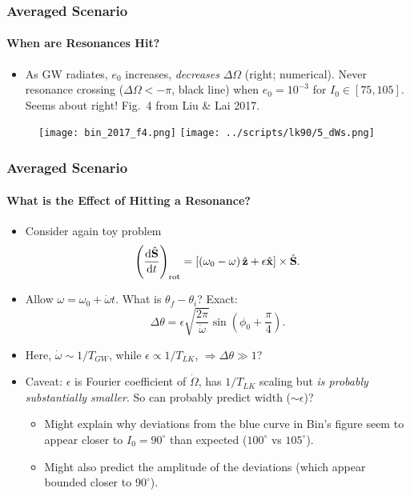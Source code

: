 \documentclass[dvipsnames, 8pt]{beamer}
\newcommand*{\rd}[2]{\frac{\mathrm{d}#1}{\mathrm{d}#2}}
\newcommand*{\bm}[1]{\boldsymbol{\mathbf{#1}}}
\newcommand*{\uv}[1]{\hat{\bm{#1}}}
\newcommand*{\p}[1]{\left(#1\right)}
\newcommand*{\s}[1]{\left[#1\right]}
\begin{document}
\begin{frame}
    \frametitle{Averaged Scenario}
    \framesubtitle{When are Resonances Hit?}

    \begin{itemize}
        \item As GW radiates, $e_0$ increases, \emph{decreases} $\Delta
            \Omega$ (right; numerical). Never resonance crossing ($\Delta \Omega
            < -\pi$, black line) when $e_0 = 10^{-3}$ for $I_0 \in [75, 105]$.
            Seems about right! Fig.~4 from Liu \& Lai 2017.
    \end{itemize}

    \begin{figure}[h]
        \centering
        \texttt{[image: bin\_2017\_f4.png]}
        \texttt{[image: ../scripts/lk90/5\_dWs.png]}
    \end{figure}
\end{frame}

\begin{frame}
    \frametitle{Averaged Scenario}
    \framesubtitle{What is the Effect of Hitting a Resonance?}

    \begin{itemize}
        \item Consider again toy problem
            \begin{equation}
                \p{\rd{\uv{S}}{t}}_{\rm rot} =
                    \s{\p{\omega_0 - \omega}\uv{z} + \epsilon
                        \uv{x}} \times \uv{S}.
            \end{equation}

        \item Allow $\omega = \omega_0 + \dot{\omega}t$. What is $\theta_f -
            \theta_i$? Exact:
            \begin{equation}
                \Delta \theta = \epsilon \sqrt{\frac{2\pi}{\dot{\omega}}}
                    \sin \p{\phi_0 + \frac{\pi}{4}}.
            \end{equation}

        \item Here, $\dot{\omega} \sim 1 / T_{GW}$, while $\epsilon \propto 1 /
            T_{LK}$, $\Rightarrow \Delta \theta \gg 1$?

        \item Caveat: $\epsilon$ is Fourier coefficient of $\dot{\Omega}$, has
            $1/T_{LK}$ scaling but \emph{is probably substantially smaller}. So
            can probably predict width ($\sim \epsilon$)?

        \begin{itemize}
            \item Might explain why deviations from the blue curve in Bin's
                figure seem to appear closer to $I_0 = 90^\circ$ than expected
                ($100^\circ$ vs $105^\circ$).

            \item Might also predict the amplitude of the deviations (which
                appear bounded closer to $90^\circ$).
        \end{itemize}
    \end{itemize}
\end{frame}
\end{document}
